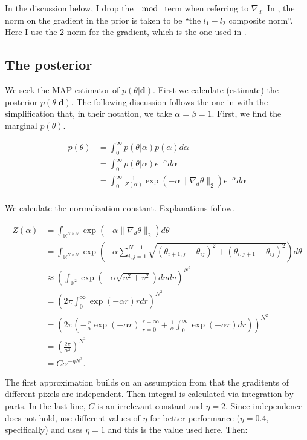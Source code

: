 \documentclass[paper=a4, fontsize=11pt]{scrartcl} %
\numberwithin{equation}{section} %
\numberwithin{figure}{section} %
\numberwithin{table}{section} %
\newcommand{\data}{\mathbf{d}}
\newcommand{\param}{\theta}
\newcommand{\grad}{\nabla_{d} }
\begin{document}
In the discussion below, I drop the $\mod$ term when referring to
$\grad$. In \cite{green2015bayesian}, the norm on the gradient in the
prior is taken to be ``the $l_1-l_2$ composite norm''. Here I use the
2-norm for the gradient, which is the one used in
\cite{chambolle2004algorithm, oliveira2009adaptive}.

\subsection{The posterior}
We seek the MAP estimator of $p( \param | \data )$. First we calculate
(estimate) the posterior $p( \param | \data )$. The following
discussion follows the one in \cite[section 4.1]{oliveira2009adaptive}
with the simplification that, in their notation, we take $\alpha =
\beta = 1$. First, we find the marginal $p( \param )$.

\begin{align*}
  p (\param) &= \int_{0}^{\infty}  p(\param| \alpha ) p(\alpha) d\alpha\\
  &= \int_{0}^{\infty}  p(\param| \alpha ) e^{-\alpha} d\alpha \\
  &= \int_{0}^{\infty}  \frac{1}{Z(\alpha)} \exp( -\alpha \|\grad\param\|_2 ) e^{-\alpha} d\alpha \\
\end{align*}

We calculate the normalization constant. Explanations follow.

\begin{align*}
  Z(\alpha) &= \int_{\mathbb{R}^{N \times N}} \exp( -\alpha \|\grad\param\|_2 ) d\param  \\
  &= \int_{\mathbb{R}^{N \times N}} \exp( -\alpha \sum_{i,j=1}^{N-1} \sqrt{ (\param_{i+1,j} -\param_{ij})^2 + (\param_{i,j+1} -\param_{ij})^2} ) d\param \\
  &\approx \left (\int_{\mathbb{R}^2}  \exp( -\alpha \sqrt{u^2 + v^2} )dudv \right )^{N^2} \\
  &= \left ( 2\pi \int_0^{\infty} \exp(-\alpha r) rdr \right )^{N^2} \\
  &= \left (2\pi \left (-\frac{r}{\alpha}\exp(-\alpha r) \big
  |_{r=0}^{r=\infty} +\frac{1}{\alpha} \int_0^{\infty}\exp(-\alpha
  r) dr \right ) \right)^{N^2}\\
  &= \left (\frac{2\pi}{\alpha^2} \right )^{N^2} \\
  & = C \alpha^{-\eta N^2}.
\end{align*} 

The first approximation builds on an assumption from
\cite{oliveira2009adaptive} that the graditents of different pixels
are independent. Then integral is calculated via integration by
parts. In the last line, $C$ is an irrelevant constant and $\eta =
2$. Since independence does not hold, \cite{oliveira2009adaptive} use
different values of $\eta$ for better performance ($\eta= 0.4$,
specifically) and \cite{green2015bayesian} uses $\eta = 1$ and this is
the value used here. Then:
\end{document}
